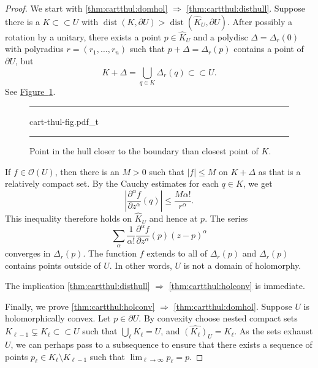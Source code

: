 \documentclass[12pt,openany]{book}
\newcommand{\sabs}[1]{\lvert {#1} \rvert}
\newcommand{\abs}[1]{\left\lvert {#1} \right\rvert}
\newcommand{\sO}{{\mathscr{O}}}
\theoremstyle{plain}
\theoremstyle{remark}
\theoremstyle{definition}
\newenvironment{myfig}{%
\begin{figure}[h!t]
\noindent\rule{\textwidth}{0.5pt}\vspace{12pt}\par\centering}%
{\par\noindent\rule{\textwidth}{0.5pt}
\end{figure}}
\theoremstyle{exercise}
\theoremstyle{example}
\newcommand{\figureref}[1]{\hyperref[#1]{Figure~\ref*{#1}}}
\begin{document}
\begin{proof}
We start with \ref{thm:cartthul:domhol} $\Rightarrow$
\ref{thm:cartthul:disthull}.
Suppose there is a $K \subset
\subset U$ with $\operatorname{dist}(K,\partial U) > \operatorname{dist}(\widehat{K}_U,\partial U)$.
After possibly a rotation by a unitary,
there exists a point $p \in \widehat{K}_U$ and a polydisc
$\Delta = \Delta_r(0)$ with polyradius $r = (r_1,\ldots,r_n)$ such that
$p + \Delta = \Delta_r(p)$ contains a point of $\partial U$, but
\begin{equation*}
K + \Delta = \bigcup_{q \in K} \Delta_r(q) \subset \subset U.
\end{equation*}
See \figureref{fig:cart-thul-fig}.

\begin{myfig}
{cart-thul-fig.pdf_t}
\caption{Point in the hull closer to the boundary than closest
point of $K$.\label{fig:cart-thul-fig}}
\end{myfig}

If $f \in \sO(U)$, then there is an $M > 0$ such that $\sabs{f} \leq M$ on
$K + \Delta$ as that is a relatively compact set.  By the Cauchy estimates
for each $q \in K$, we get
\begin{equation*}
\abs{\frac{\partial^\alpha f}{\partial z^\alpha}(q)} \leq \frac{M
\alpha!}{r^\alpha} .
\end{equation*}
This inequality therefore holds on $\widehat{K}_U$ and hence at $p$.
The series
\begin{equation*}
\sum_{\alpha}
\frac{1}{\alpha !}\frac{\partial^\alpha f}{\partial z^\alpha}(p) {(z-p)}^\alpha
\end{equation*}
converges in $\Delta_r(p)$.  The function $f$ extends to all of $\Delta_r(p)$ and
$\Delta_r(p)$ contains points outside of $U$.
In other words, $U$ is not a domain of holomorphy.

The implication \ref{thm:cartthul:disthull} $\Rightarrow$
\ref{thm:cartthul:holconv} is immediate.

Finally, we prove
\ref{thm:cartthul:holconv} $\Rightarrow$
\ref{thm:cartthul:domhol}.
Suppose $U$ is holomorphically convex.  Let $p \in \partial U$.
By convexity choose nested compact sets $K_{\ell-1} \subsetneq K_\ell \subset
\subset U$ such that $\bigcup_\ell K_\ell = U$, and $\widehat{(K_\ell)}_U =
K_\ell$.
As the sets exhaust $U$, we can perhaps pass to a subsequence
to ensure that
there exists a
sequence of points $p_\ell \in K_\ell \setminus K_{\ell-1}$ such that
$\lim_{\ell\to\infty} p_\ell = p$.


\end{proof}
\end{document}
